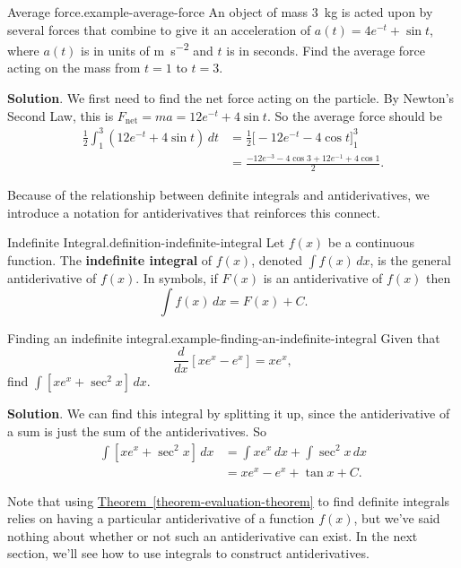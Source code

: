\documentclass[10pt,]{book}
\newcommand{\terminology}[1]{\textbf{#1}}
\numberwithin{equation}{section}
\newcommand{\dv}[3][]{\dfrac{d^{#1} #2}{d #3^{#1}}}
\begin{document}
\begin{example}{Average force.}{example-average-force}%
\hypertarget{p-453}{}%
An object of mass \SI{3}{\kilo\gram} is acted upon by several forces that combine to give it an acceleration of \(a(t) = 4e^{-t} + \sin t\), where \(a(t)\) is in units of \si{\meter\per\second\tothe{2}} and \(t\) is in seconds. Find the average force acting on the mass from \(t=1\) to \(t=3\).%
\par\smallskip%
\noindent\textbf{Solution}.\hypertarget{solution-99}{}\quad%
\hypertarget{p-454}{}%
We first need to find the net force acting on the particle. By Newton's Second Law, this is \(F_{\text{net}} = ma = 12e^{-t} + 4\sin t\). So the average force should be%
\begin{align*}
\frac{1}{2}\int_{1}^{3}(12e^{-t} + 4\sin t)\,dt & =  \frac{1}{2}\big[-12e^{-t} - 4\cos t\big]_{1}^{3}\\
& = \frac{-12e^{-3} - 4\cos 3 + 12e^{-1} + 4\cos1}{2}. 
\end{align*}
%
\end{example}
\hypertarget{p-455}{}%
Because of the relationship between definite integrals and antiderivatives, we introduce a notation for antiderivatives that reinforces this connect.%
\begin{definition}{Indefinite Integral.}{definition-indefinite-integral}%
\hypertarget{p-456}{}%
Let \(f(x)\) be a continuous function. The \terminology{indefinite integral} of \(f(x)\), denoted \(\int f(x)\,dx\), is the general antiderivative of \(f(x)\). In symbols, if \(F(x)\) is an antiderivative of \(f(x)\) then%
\begin{equation*}
\int f(x)\,dx = F(x) + C.
\end{equation*}
%
\end{definition}
\begin{example}{Finding an indefinite integral.}{example-finding-an-indefinite-integral}%
\hypertarget{p-457}{}%
Given that%
\begin{equation*}
\dv{}{x}[xe^{x} - e^{x}] = xe^{x},
\end{equation*}
find \(\int [xe^{x}+\sec^{2}x]\,dx\).%
\par\smallskip%
\noindent\textbf{Solution}.\hypertarget{solution-100}{}\quad%
\hypertarget{p-458}{}%
We can find this integral by splitting it up, since the antiderivative of a sum is just the sum of the antiderivatives. So%
\begin{align*}
\int[xe^{x} + \sec^{2}x]\,dx & = \int xe^{x}\,dx + \int\sec^{2}x\,dx \\
& = xe^{x}-e^{x} + \tan x + C. 
\end{align*}
%
\end{example}
\hypertarget{p-459}{}%
Note that using \hyperref[theorem-evaluation-theorem]{Theorem~\ref{theorem-evaluation-theorem}} to find definite integrals relies on having a particular antiderivative of a function \(f(x)\), but we've said nothing about whether or not such an antiderivative can exist. In the next section, we'll see how to use integrals to construct antiderivatives.%
%
%
\typeout{************************************************}
\typeout{************************************************}
%
\end{document}
